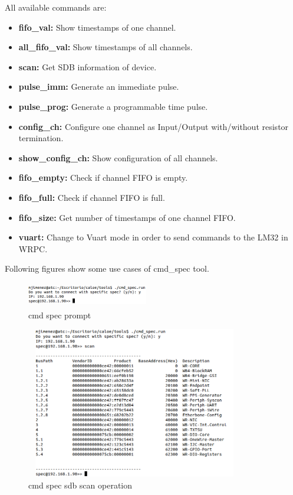 All available commands are:

\begin{itemize}
 \item {\textbf{fifo\_val: }Show timestamps of one channel.}
 \item {\textbf{all\_fifo\_val: }Show timestamps of all channels.}
 \item {\textbf{scan: }Get SDB information of device.}
 \item {\textbf{pulse\_imm: }Generate an immediate pulse.}
 \item {\textbf{pulse\_prog: }Generate a programmable time pulse.}
 \item {\textbf{config\_ch: }Configure one channel as Input/Output with/without resistor termination.}
 \item {\textbf{show\_config\_ch: }Show configuration of all channels.}
 \item {\textbf{fifo\_empty: }Check if channel FIFO is empty.}
 \item {\textbf{fifo\_full: }Check if channel FIFO is full.}
 \item {\textbf{fifo\_size: }Get number of timestamps of one channel FIFO.}
 \item {\textbf{vuart: }Change to Vuart mode in order to send commands to the LM32 in WRPC.}
\end{itemize}

Following figures show some use cases of cmd\_spec tool.

\begin{figure}[H]
\centering
\includegraphics[width=200px,height=40px]{img/cmd_spec_prompt.png}
\caption{cmd spec prompt}
\label{cmd_spec_prompt_img}
\end{figure}

\begin{figure}[H]
\centering
\includegraphics[width=360px,height=250px]{img/cmd_spec_scan_sdb.png}
\caption{cmd spec sdb scan operation}
\label{cmd_spec_scan_img}
\end{figure}

